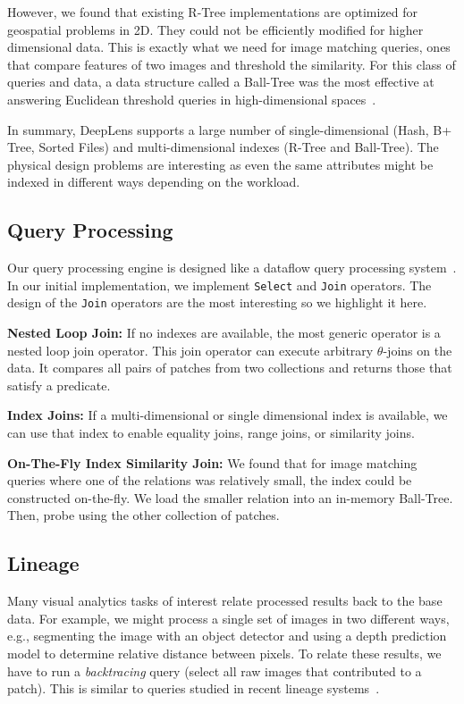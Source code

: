 However, we found that existing R-Tree implementations are optimized for geospatial problems in 2D.
They could not be efficiently modified for higher dimensional data.
This is exactly what we need for image matching queries, ones that compare features of two images and threshold the similarity.
For this class of queries and data, a data structure called a Ball-Tree was the most effective at answering Euclidean threshold queries in high-dimensional spaces~\cite{kumar2008good}.

In summary, \textsf{DeepLens} supports a large number of single-dimensional (Hash, B+ Tree, Sorted Files) and multi-dimensional indexes (R-Tree and Ball-Tree). The physical design problems are interesting as even the same attributes might be indexed in different ways depending on the workload.

\subsection{Query Processing}
Our query processing engine is designed like a dataflow query processing system~\cite{graefe1994volcano}.
In our initial implementation, we implement \texttt{Select} and \texttt{Join} operators. The design of the \texttt{Join} operators are the most interesting so we highlight it here.  

\vspace{0.25em}
\noindent \textbf{Nested Loop Join: } If no indexes are available, the most generic operator is a nested loop join operator. This join operator can execute arbitrary $\theta$-joins on the data.
It compares all pairs of patches from two collections and returns those that satisfy a predicate.

\vspace{0.25em}
\noindent \textbf{Index Joins: } If a multi-dimensional or single dimensional index is available, we can use that index to enable equality joins, range joins, or similarity joins.

\vspace{0.25em}
\noindent \textbf{On-The-Fly Index Similarity Join: } We found that for image matching queries where one of the relations was relatively small, the index could be constructed on-the-fly.
We load the smaller relation into an in-memory Ball-Tree. Then, probe using the other collection of patches.

\subsection{Lineage}
Many visual analytics tasks of interest relate processed results back to the base data.
For example, we might process a single set of images in two different ways, e.g., segmenting the image with an object detector and using a depth prediction model to determine relative distance between pixels.
To relate these results, we have to run a \emph{backtracing} query (select all raw images that contributed to a patch).
This is similar to queries studied in recent lineage systems~\cite{psallidas2018smoke}. 

